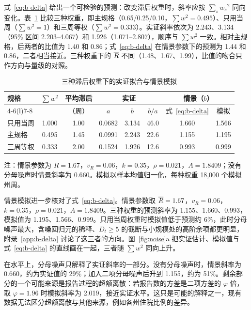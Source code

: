 式~\eqref{eq:b-delta} 给出一个可检验的预测：改变滞后权重时，斜率应按 $\sum_s {w_s}^2$ 同向变化。表~\ref{tab:lag-weights} 比较三种权重，即主规格（0.65/0.25/0.10，$\sum w^2=0.495$）、只用当周（$\sum w^2=1$）和三周等权（$\sum w^2=0.333$）。实证斜率依次为 2.243、3.134（95\% 区间 2.203--4.067）和 1.926（1.071--2.807），顺序与 $\sum w^2$ 一致。相对主规格，后两者的比值为 1.40 和 0.86；式~\eqref{eq:b-delta} 在情景参数下的预测为 1.44 和 0.86，二者相当接近。三种权重下的 $\overline{R}$ 不同（1.48、1.67、1.99），比值的吻合只作方向与量级的对照。

\begin{table}[!tbp]
  \centering
  \caption{三种滞后权重下的实证拟合与情景模拟}
  \label{tab:lag-weights}
  \small
  \begin{tabular}{@{}lccccccc@{}}
    \toprule
    \multirow{2}{*}{规格} & \multirow{2}{*}{$\sum w^2$} & 平均滞后 & \multicolumn{3}{c}{实证} & \multicolumn{2}{c}{情景（$b$）} \\
    \cmidrule(lr){4-6}\cmidrule(l){7-8}
     & & （周） & $a$ & $b$ & $b/a$ & 式~\eqref{eq:b-delta} & 模拟 \\
    \midrule
    只用当周 & 1.000 & 1.00 & 0.0682 & 3.134 & 46.0 & 1.660 & 1.566 \\
    主规格 & 0.495 & 1.45 & 0.0991 & 2.243 & 22.6 & 1.155 & 1.195 \\
    三周等权 & 0.333 & 2.00 & 0.1524 & 1.926 & 12.6 & 0.993 & 0.999 \\
    \bottomrule
  \end{tabular}

  \vspace{4pt}
  {\small 注：情景参数为 $\overline{R}=1.67$，$v_R=0.06$，$k=0.35$，$\rho=0.021$，$A=1.8409$；没有分母噪声时情景斜率为 0.660。模拟以样本均值归一化，每种权重 18,000 个模拟州周。}
\end{table}

情景模拟进一步核对了式~\eqref{eq:b-delta}。情景参数取 $\overline{R}=1.67$，$v_R=0.06$，$k=0.35$，$\rho=0.021$，$A=1.8409$。三种权重的预测斜率为 1.155、1.660、0.993，模拟值为 1.195、1.566、0.999。只用当周权重时模拟值低于预测约 6\%，此时分母噪声最大，含噪回归元的稀释、$D_t\geq5$ 的截断与小规模处的高阶余项都更明显，附录~\ref{app:b-delta} 讨论了这三者的方向。图~\ref{fig:noise}a 把实证估计、模拟值与式~\eqref{eq:b-delta} 的直线画在一起，三者随 $\sum w^2$ 同向上升。

在水平上，分母噪声只解释了实证斜率的一部分。没有分母噪声时，情景斜率为 0.660，约为实证值的 29\%；加入二项分母噪声后升到 1.155，约为 51\%。剩余部分的一个可能来源是报告过程的超额离散：若报告数的方差是二项方差的 $\varphi$ 倍，取 $\varphi=1.96$ 时模拟斜率为 2.019，接近实证水平。这只是可能的解释之一，现有数据无法区分超额离散与其他来源，例如各州住院比例的差异。

